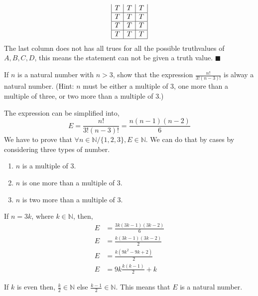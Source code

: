 \documentclass{exam}
\theoremstyle{mytheoremstyle}
\theoremstyle{mytheoremstyle}
\theoremstyle{myproblemstyle}
\begin{document}
\begin{questions}
\begin{parts}
\begin{solution}
\begin{equation*}
\begin{array}{|c|c|c|c|c|c|c|c|c|c|c|}
					T                               & T                                      & T              \\\hline
					T                               & T                                      & T              \\\hline
					T                               & T                                      & T              \\\hline
					T                               & T                                      & T              \\\hline
				\end{array}
			\end{equation*}
			The last column does not has all trues for all the possible truthvalues of \(A,B,C,D\), this means the statement can not be given a truth value. \(\blacksquare\)
		\end{solution}
	\end{parts}

	\question If \(n\) is a natural number with \(n > 3\), show that the expression \(\displaystyle\frac{n!}{3!(n-3)!}\) is alway a natural number. (Hint: \(n\) must be either a multiple of 3, one more than a multiple of three, or two more than a multiple of 3.)
	\begin{solution}
		The expression can be simplified into,
		\[E=\frac{n!}{3!(n-3)!}=\frac{n(n-1)(n-2)}{6}\]
		We have to prove that \(\forall n\in\mathbb{N}/\{1,2,3\},E\in\mathbb{N}\). We can do that by cases by considering three types of number.

		\begin{enumerate}
			\item \(n\) is a multiple of 3.
			\item \(n\) is one more than a multiple of 3.
			\item \(n\) is two more than a multiple of 3.
		\end{enumerate}

		If \(n=3k\), where \(k\in\mathbb{N}\), then,
		\begin{equation}
			\begin{split}
				E&=\frac{3k(3k-1)(3k-2)}{6}\\
				E&=\frac{k(3k-1)(3k-2)}{2}\\
				E&=\frac{k(9k^2-9k+2)}{2}\\
				E&=9k\frac{k(k-1)}{2}+k
			\end{split}
		\end{equation}

		If \(k\) is even then, \(\displaystyle\frac{k}{2}\in\mathbb{N}\) else \(\displaystyle\frac{k-1}{2}\in\mathbb{N}\). This means that \(E\) is a natural number.


\end{solution}
\end{questions}
\end{document}
